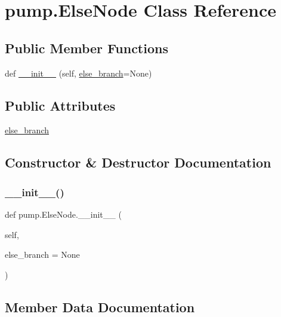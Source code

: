 \hypertarget{classpump_1_1_else_node}{}\section{pump.\+Else\+Node Class Reference}
\label{classpump_1_1_else_node}
\subsection*{Public Member Functions}
\begin{DoxyCompactItemize}
\item 
def \mbox{\hyperlink{classpump_1_1_else_node_a7489ff8c6c7ddfe6bd6593b8ecccd819}{\+\_\+\+\_\+init\+\_\+\+\_\+}} (self, \mbox{\hyperlink{classpump_1_1_else_node_ac838a0fe9f5d713c7f56939eed5e128d}{else\+\_\+branch}}=None)
\end{DoxyCompactItemize}
\subsection*{Public Attributes}
\begin{DoxyCompactItemize}
\item 
\mbox{\hyperlink{classpump_1_1_else_node_ac838a0fe9f5d713c7f56939eed5e128d}{else\+\_\+branch}}
\end{DoxyCompactItemize}


\subsection{Constructor \& Destructor Documentation}
\mbox{\label{classpump_1_1_else_node_a7489ff8c6c7ddfe6bd6593b8ecccd819}} 
\subsubsection{\texorpdfstring{\_\_init\_\_()}{\_\_init\_\_()}}
{\footnotesize\ttfamily def pump.\+Else\+Node.\+\_\+\+\_\+init\+\_\+\+\_\+ (\begin{DoxyParamCaption}\item[{}]{self,  }\item[{}]{else\+\_\+branch = {\ttfamily None} }\end{DoxyParamCaption})}



\subsection{Member Data Documentation}
\mbox{\label{classpump_1_1_else_node_ac838a0fe9f5d713c7f56939eed5e128d}} 
